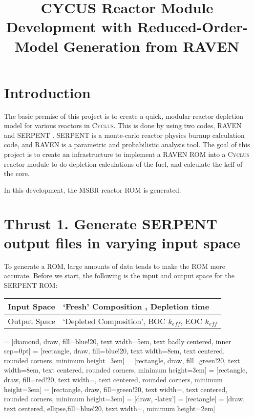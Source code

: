 \documentclass{article}
\newcommand{\Cyclus}{\textsc{Cyclus}\xspace}%
\begin{document}
\title{CYCUS Reactor Module Development with Reduced-Order-Model Generation from RAVEN}

\date{}                     %



\section{Introduction}

The basic premise of this project is to create a quick, modular
reactor depletion model for various reactors in \Cyclus. This is done
by using two codes, RAVEN \cite{alfonsi_raven_2013} and SERPENT \cite{leppanen_serpent-a_2013} . SERPENT is a monte-carlo
reactor physics burnup calculation code, and RAVEN is a parametric
and probabilistic analysis tool. The goal of this project is to 
create an infrastructure to implement a RAVEN \gls{ROM} into a \Cyclus
reactor module to do depletion calculations of the fuel, and calculate
the keff of the core. 

In this development, the \gls{MSBR} \cite{robertson_conceptual_1971}
reactor \gls{ROM} is generated.

\section*{Thrust 1. Generate SERPENT output files in varying input space}
To generate a \gls{ROM}, large amounts of data tends to make the
\gls{ROM} more accurate. Before we start, the following is the input and 
output space for the SERPENT \gls{ROM}:

\begin{center}
\begin{tabular}{ l l }
    \hline
    Input Space & `Fresh' Composition , Depletion time \\
    \hline
    Output Space & `Depleted Composition', BOC $k_{eff}$, EOC $k_{eff}$ \\
    \hline
\end{tabular}
\label{tab:space}
\end{center} 


 = [diamond, draw, fill=blue!20, 
    text width=5em, text badly centered,  inner sep=0pt]
 = [rectangle, draw, fill=blue!20, 
    text width=8em, text centered, rounded corners, minimum height=3em]
 = [rectangle, draw, fill=green!20, 
    text width=8em, text centered, rounded corners, minimum height=3em]
 = [rectangle, draw, fill=red!20, 
    text width=, text centered, rounded corners, minimum height=3em]
 = [rectangle, draw, fill=green!20, 
    text width=, text centered, rounded corners, minimum height=3em]
 = [draw, -latex']
 = [rectangle]
 = [draw, text centered, ellipse,fill=blue!20, text width=,
    minimum height=2em]
\end{document}
